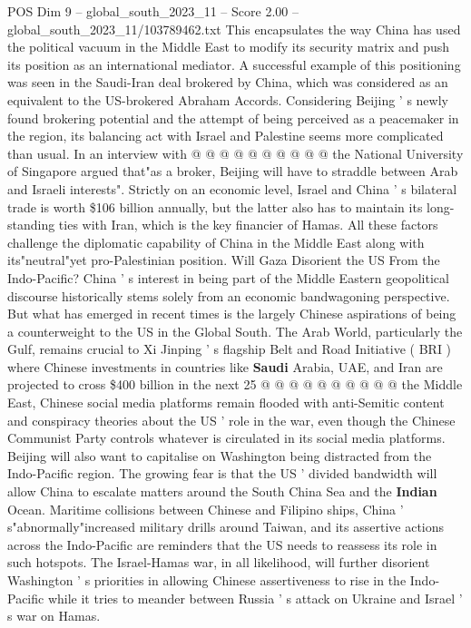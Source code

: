\begin{textsample}{POS Dim 9 – global\_south\_2023\_11 – Score 2.00 – global\_south\_2023\_11/103789462.txt}
This encapsulates the way China has used the political vacuum in the Middle East to modify its security matrix and push its position as an international mediator.
A successful example of this positioning was seen in the Saudi-Iran deal brokered by China, which was considered as an equivalent to the US-brokered Abraham Accords.
Considering Beijing ' s newly found brokering potential and the attempt of being perceived as a peacemaker in the region, its balancing act with Israel and Palestine seems more complicated than usual.
In an interview with @ @ @ @ @ @ @ @ @ @ the National University of Singapore argued that"as a broker, Beijing will have to straddle between Arab and Israeli interests".
Strictly on an economic level, Israel and China ' s bilateral trade is worth \$106 billion annually, but the latter also has to maintain its long-standing ties with Iran, which is the key financier of Hamas.
All these factors challenge the diplomatic capability of China in the Middle East along with its"neutral"yet pro-Palestinian position.
Will Gaza Disorient the US From the Indo-Pacific?
China ' s interest in being part of the Middle Eastern geopolitical discourse historically stems solely from an economic bandwagoning perspective.
But what has emerged in recent times is the largely Chinese aspirations of being a counterweight to the US in the Global South.
The Arab World, particularly the Gulf, remains crucial to Xi Jinping ' s flagship Belt and Road Initiative ( BRI ) where Chinese investments in countries like \textbf{Saudi} Arabia, UAE, and Iran are projected to cross \$400 billion in the next 25 @ @ @ @ @ @ @ @ @ @ the Middle East, Chinese social media platforms remain flooded with anti-Semitic content and conspiracy theories about the US ' role in the war, even though the Chinese Communist Party controls whatever is circulated in its social media platforms.
Beijing will also want to capitalise on Washington being distracted from the Indo-Pacific region.
The growing fear is that the US ' divided bandwidth will allow China to escalate matters around the South China Sea and the \textbf{Indian} Ocean.
Maritime collisions between Chinese and Filipino ships, China ' s"abnormally"increased military drills around Taiwan, and its assertive actions across the Indo-Pacific are reminders that the US needs to reassess its role in such hotspots.
The Israel-Hamas war, in all likelihood, will further disorient Washington ' s priorities in allowing Chinese assertiveness to rise in the Indo-Pacific while it tries to meander between Russia ' s attack on Ukraine and Israel ' s war on Hamas.

\end{textsample}
